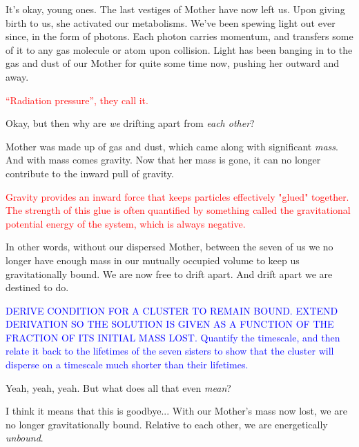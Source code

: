\documentclass[main.tex]{subfiles}
\begin{document}
\par \Maia It's okay, young ones.  The last vestiges of Mother have now left us.  Upon giving birth to us, she activated our metabolisms.  We've been spewing light out ever since, in the form of photons.  Each photon carries momentum, and transfers some of it to any gas molecule or atom upon collision.  Light has been banging in to the gas and dust of our Mother for quite some time now, pushing her outward and away.

\par \textcolor{red} {\nar ``Radiation pressure'', they call it.}

\par \Electra Okay, but then why are \textit{we} drifting apart from \textit{each other}?

\par \Maia Mother was made up of gas and dust, which came along with significant \textit{mass}.  And with mass comes gravity.  Now that her mass is gone, it can no longer contribute to the inward pull of gravity.

\par \textcolor{red} {\nar Gravity provides an inward force that keeps particles effectively "glued" together.  The strength of this glue is often quantified by something called the gravitational potential energy of the system, which is always negative.}  

\par \Maia In other words, without our dispersed Mother, between the seven of us we no longer have enough mass in our mutually occupied volume to keep us gravitationally bound.  We are now free to drift apart.  And drift apart we are destined to do. 

\par \textcolor{blue} {\nar DERIVE CONDITION FOR A CLUSTER TO REMAIN BOUND.  EXTEND DERIVATION SO THE SOLUTION IS GIVEN AS A FUNCTION OF THE FRACTION OF ITS INITIAL MASS LOST. Quantify the timescale, and then relate it back to the lifetimes of the seven sisters to show that the cluster will disperse on a timescale much shorter than their lifetimes.}   

\par \Taygete Yeah, yeah, yeah.  But what does all that even \textit{mean}?

\par \Sterope I think it means that this is goodbye...  With our Mother's mass now lost, we are no longer gravitationally bound.  Relative to each other, we are energetically \textit{unbound}.
\end{document}
